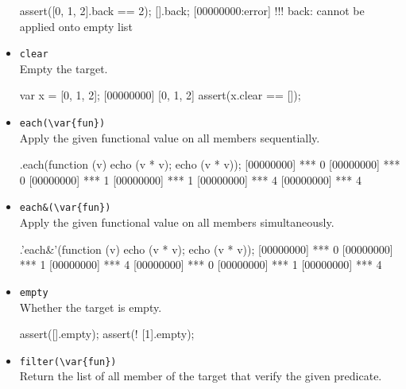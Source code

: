 \begin{itemize}
\begin{urbiscript}[firstnumber=last]
assert([0, 1, 2].back == 2);
[].back;
[00000000:error] !!! back: cannot be applied onto empty list
\end{urbiscript}

\item \lstinline|clear|\\
  Empty the target.

\begin{urbiscript}[firstnumber=last]
var x = [0, 1, 2];
[00000000] [0, 1, 2]
assert(x.clear == []);
\end{urbiscript}

\item \lstinline|each(\var{fun})|\\
Apply the given functional value on all members sequentially.

\begin{urbiscript}[firstnumber=last]
[0, 1, 2].each(function (v) {echo (v * v); echo (v * v)});
[00000000] *** 0
[00000000] *** 0
[00000000] *** 1
[00000000] *** 1
[00000000] *** 4
[00000000] *** 4
\end{urbiscript}

\item \lstinline|each&(\var{fun})|\\
Apply the given functional value on all members simultaneously.

\begin{urbiscript}[firstnumber=last]
[0, 1, 2].'each&'(function (v) {echo (v * v); echo (v * v)});
[00000000] *** 0
[00000000] *** 1
[00000000] *** 4
[00000000] *** 0
[00000000] *** 1
[00000000] *** 4
\end{urbiscript}

\item \lstinline|empty|\\
  Whether the target is empty.

\begin{urbiscript}[firstnumber=last]
assert([].empty);
assert(! [1].empty);
\end{urbiscript}

\item \lstinline|filter(\var{fun})|\\
Return the list of all member of the target that verify the given
predicate.



\end{itemize}
